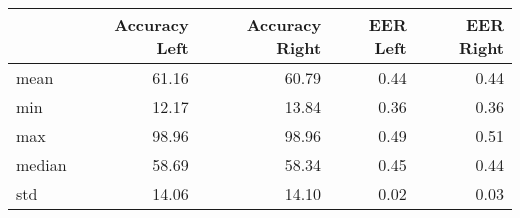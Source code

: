 \begin{tabular}{lrrrr}
\toprule
{} &  Accuracy Left &  Accuracy Right &  EER Left &  EER Right \\
\midrule
mean   &          61.16 &           60.79 &      0.44 &       0.44 \\
min    &          12.17 &           13.84 &      0.36 &       0.36 \\
max    &          98.96 &           98.96 &      0.49 &       0.51 \\
median &          58.69 &           58.34 &      0.45 &       0.44 \\
std    &          14.06 &           14.10 &      0.02 &       0.03 \\
\bottomrule
\end{tabular}
